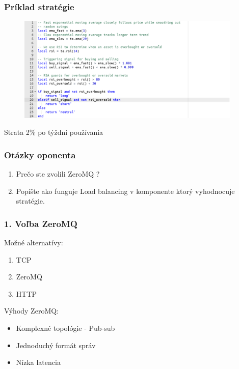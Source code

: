 \documentclass[10pt,xcolor=pdflatex]{beamer}
\begin{document}

\begin{frame}
    \frametitle{Príklad stratégie}
    \begin{figure}
        \flushleft

        \includegraphics[width=0.95\textwidth]{img/strat.png}
    \end{figure}
    Strata 2\% po týždni používania
    \newline
    \begin{center}

\end{center}
\end{frame}

\begin{frame}[noframenumbering]
    \frametitle{Otázky oponenta}
    \begin{enumerate}
        \item Prečo ste zvolili ZeroMQ ?
        \item Popíšte ako funguje Load balancing v komponente ktorý vyhodnocuje stratégie.
    \end{enumerate}
\end{frame}

\begin{frame}[noframenumbering]
    \frametitle{1. Voľba ZeroMQ}
    Možné alternatívy:
    \begin{enumerate}
        \item TCP
        \item ZeroMQ
        \item HTTP
    \end{enumerate}
    Výhody ZeroMQ:
    \begin{itemize}
        \item Komplexné topológie - Pub-sub
        \item Jednoduchý formát správ
        \item Nízka latencia
    \end{itemize}
\end{frame}
\end{document}
